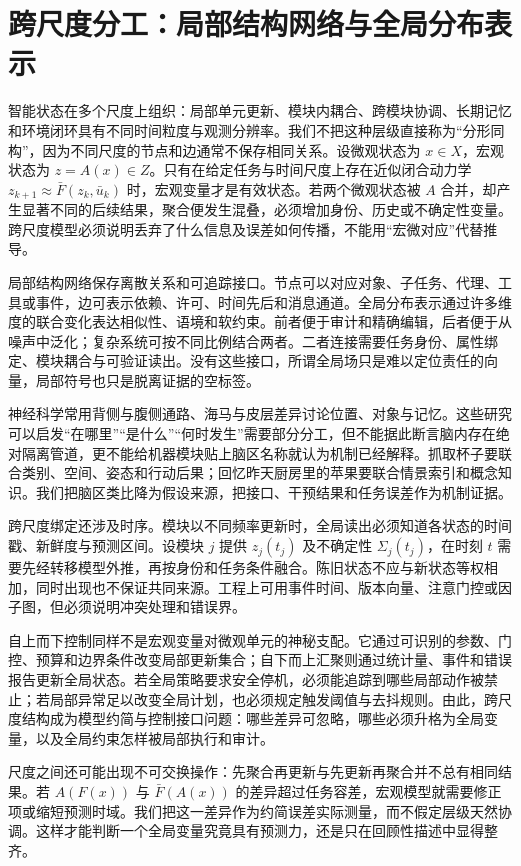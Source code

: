 \section{跨尺度分工：局部结构网络与全局分布表示}
\label{sec:fractal_isomorphism_macro_micro}

智能状态在多个尺度上组织：局部单元更新、模块内耦合、跨模块协调、长期记忆和环境闭环具有不同时间粒度与观测分辨率。我们不把这种层级直接称为“分形同构”，因为不同尺度的节点和边通常不保存相同关系。设微观状态为 $x\in X$，宏观状态为 $z=A(x)\in Z$。只有在给定任务与时间尺度上存在近似闭合动力学 $z_{k+1}\approx\bar F(z_k,\bar u_k)$ 时，宏观变量才是有效状态。若两个微观状态被 $A$ 合并，却产生显著不同的后续结果，聚合便发生混叠，必须增加身份、历史或不确定性变量。跨尺度模型必须说明丢弃了什么信息及误差如何传播，不能用“宏微对应”代替推导。

局部结构网络保存离散关系和可追踪接口。节点可以对应对象、子任务、代理、工具或事件，边可表示依赖、许可、时间先后和消息通道。全局分布表示通过许多维度的联合变化表达相似性、语境和软约束。前者便于审计和精确编辑，后者便于从噪声中泛化；复杂系统可按不同比例结合两者。二者连接需要任务身份、属性绑定、模块耦合与可验证读出。没有这些接口，所谓全局场只是难以定位责任的向量，局部符号也只是脱离证据的空标签。

神经科学常用背侧与腹侧通路、海马与皮层差异讨论位置、对象与记忆。这些研究可以启发“在哪里”“是什么”“何时发生”需要部分分工，但不能据此断言脑内存在绝对隔离管道，更不能给机器模块贴上脑区名称就认为机制已经解释。抓取杯子要联合类别、空间、姿态和行动后果；回忆昨天厨房里的苹果要联合情景索引和概念知识。我们把脑区类比降为假设来源，把接口、干预结果和任务误差作为机制证据。

跨尺度绑定还涉及时序。模块以不同频率更新时，全局读出必须知道各状态的时间戳、新鲜度与预测区间。设模块 $j$ 提供 $z_j(t_j)$ 及不确定性 $\Sigma_j(t_j)$，在时刻 $t$ 需要先经转移模型外推，再按身份和任务条件融合。陈旧状态不应与新状态等权相加，同时出现也不保证共同来源。工程上可用事件时间、版本向量、注意门控或因子图，但必须说明冲突处理和错误界。

自上而下控制同样不是宏观变量对微观单元的神秘支配。它通过可识别的参数、门控、预算和边界条件改变局部更新集合；自下而上汇聚则通过统计量、事件和错误报告更新全局状态。若全局策略要求安全停机，必须能追踪到哪些局部动作被禁止；若局部异常足以改变全局计划，也必须规定触发阈值与去抖规则。由此，跨尺度结构成为模型约简与控制接口问题：哪些差异可忽略，哪些必须升格为全局变量，以及全局约束怎样被局部执行和审计。

尺度之间还可能出现不可交换操作：先聚合再更新与先更新再聚合并不总有相同结果。若 $A(F(x))$ 与 $\bar F(A(x))$ 的差异超过任务容差，宏观模型就需要修正项或缩短预测时域。我们把这一差异作为约简误差实际测量，而不假定层级天然协调。这样才能判断一个全局变量究竟具有预测力，还是只在回顾性描述中显得整齐。


